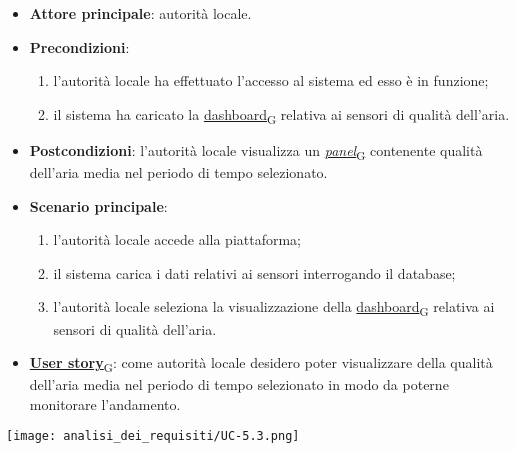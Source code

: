 \newpage

\begin{itemize}
	\item \textbf{Attore principale}: autorità locale.
	\item \textbf{Precondizioni}:
	      \begin{enumerate}
		      \item l'autorità locale ha effettuato l'accesso al sistema ed esso è in funzione;
		      \item il sistema ha caricato la \href{https://7last.github.io/docs/rtb/documentazione-interna/glossario\#dashboard}{dashboard\textsubscript{G}} relativa ai sensori di qualità dell'aria.
	      \end{enumerate}
	\item \textbf{Postcondizioni}: l'autorità locale visualizza un \href{https://7last.github.io/docs/rtb/documentazione-interna/glossario\#panel}{\textit{panel}\textsubscript{G}} contenente qualità dell'aria media nel periodo di tempo selezionato.
	\item \textbf{Scenario principale}:
	      \begin{enumerate}
		      \item l'autorità locale accede alla piattaforma;
		      \item il sistema carica i dati relativi ai sensori interrogando il database;
		      \item l'autorità locale seleziona la visualizzazione della \href{https://7last.github.io/docs/rtb/documentazione-interna/glossario\#dashboard}{dashboard\textsubscript{G}} relativa ai sensori di qualità dell'aria.
	      \end{enumerate}
	\item \href{https://7last.github.io/docs/rtb/documentazione-interna/glossario\#user-story}{\textbf{User story}\textsubscript{G}}: come autorità locale desidero poter visualizzare della qualità dell'aria media nel periodo di tempo selezionato
	      in modo da poterne monitorare l'andamento.
\end{itemize}
\begin{center}
	\texttt{[image: analisi\_dei\_requisiti/UC-5.3.png]}
\end{center}

